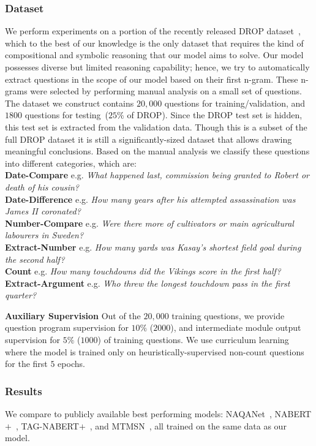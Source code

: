 \documentclass[main.tex]{subfiles}
\begin{document}
\subsubsection{Dataset}
\label{sssec:dataset}
We perform experiments on a portion of the recently released DROP dataset~\cite{drop-2019}, which to the best of our knowledge is the only dataset that requires the kind of compositional and symbolic reasoning that our model aims to solve. Our model possesses diverse but limited reasoning capability; hence, we try to automatically extract questions in the scope of our model based on their first n-gram.
These n-grams were selected by performing manual analysis on a small set of questions.
The dataset we construct contains $20,000$ questions for training/validation, and $1800$ questions for testing~($25\%$ of DROP). Since the DROP test set is hidden, this test set is extracted from the validation data.
Though this is a subset of the full DROP dataset it is still a significantly-sized dataset that allows drawing meaningful conclusions.
Based on the manual analysis we classify these questions into different categories, which are:
\\
\textbf{Date-Compare} e.g. \textit{What happened last, commission being granted to Robert or death of his cousin?}\\
\textbf{Date-Difference} e.g. \textit{How many years after his attempted assassination was James II coronated?}\\
\textbf{Number-Compare} e.g. \textit{Were there more of cultivators or main agricultural labourers in Sweden?}\\
\textbf{Extract-Number} e.g. \textit{How many yards was Kasay's shortest field goal during the second half?}\\
\textbf{Count} e.g. \textit{How many touchdowns did the Vikings score in the first half?}\\
\textbf{Extract-Argument} e.g. \textit{Who threw the longest touchdown pass in the first quarter?}


\textbf{Auxiliary Supervision}
Out of the $20,000$ training questions, we provide question program supervision for $10\%$ ($2000$), and intermediate module output supervision for $5\%$ ($1000$) of training questions. We use curriculum learning~\cite{bengio-curriculum-2009} where the model is trained only on heuristically-supervised non-count questions for the first $5$ epochs.

\subsubsection{Results}
\label{sssec:results}
We compare to publicly available best performing models: NAQANet~\cite{drop-2019}, NABERT$\text{+}$~\cite{nabert-2019}, TAG-NABERT$+$~\cite{tagbert-2019}, and MTMSN~\cite{mtmsn-2019}, all trained on the same data as our model.
\end{document}
